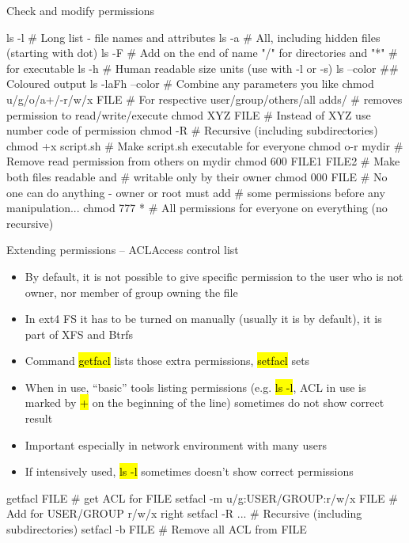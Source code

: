 \documentclass[compress, ucs, xelatex, 11pt, xcolor=svgnames,
  hyperref={
    bookmarks=true,
    unicode=true,
    colorlinks=true,
    pdftitle={Linux, command line and MetaCentrum},
    plainpages=false,
    pdfauthor={Vojtech Zeisek},
    pdfsubject={Course about use of Linux command line, writing shell scripts and using MetaCentrum of CESNET},
    pdfcreator={XeLaTeX},
    pdfkeywords={Linux, GNU, BASH, shell, command line, MetaCentrum},
    linkcolor=DarkRed,
    anchorcolor=DarkBlue,
    citecolor=Indigo,
    filecolor=NavyBlue,
    menucolor=DarkMagenta,
    urlcolor=DarkBlue,
    pdftex},
  url={hyphens, lowtilde} %
  ]{beamer}
\renewcommand{\texttt}[1]{\hl{\ttfamily #1}}
\begin{document}
\begin{frame}[fragile]{Check and modify permissions}
  \begin{bashcode}
    ls -l # Long list - file names and attributes
    ls -a # All, including hidden files (starting with dot)
    ls -F # Add on the end of name "/" for directories and "*"
          # for executable
    ls -h # Human readable size units (use with -l or -s)
    ls --color ## Coloured output
    ls -laFh --color # Combine any parameters you like
    chmod u/g/o/a+/-r/w/x FILE # For respective user/group/others/all adds/
                               # removes permission to read/write/execute
    chmod XYZ FILE # Instead of XYZ use number code of permission
    chmod -R # Recursive (including subdirectories)
    chmod +x script.sh # Make script.sh executable for everyone
    chmod o-r mydir # Remove read permission from others on mydir
    chmod 600 FILE1 FILE2 # Make both files readable and
                          # writable only by their owner
    chmod 000 FILE # No one can do anything - owner or root must add
                   # some permissions before any manipulation...
    chmod 777 * # All permissions for everyone on everything (no recursive)
  \end{bashcode}
\end{frame}

\begin{frame}[fragile]{Extending permissions -- ACL}{Access control list}
  \label{acl}
  \begin{itemize}
    \item By default, it is not possible to give specific permission to the user who is not owner, nor member of group owning the file
    \item In ext4 FS it has to be turned on manually (usually it is by default), it is part of XFS and Btrfs
    \item Command \texttt{getfacl} lists those extra permissions, \texttt{setfacl} sets
    \item When in use, ``basic'' tools listing permissions (e.g. \texttt{ls -l}, ACL in use is marked by \texttt{+} on the beginning of the line) sometimes do not show correct result
    \item Important especially in network environment with many users
    \item If intensively used, \texttt{ls -l} sometimes doesn't show correct permissions
  \end{itemize}
  \begin{bashcode}
    getfacl FILE # get ACL for FILE
    setfacl -m u/g:USER/GROUP:r/w/x FILE # Add for USER/GROUP r/w/x right
    setfacl -R ... # Recursive (including subdirectories)
    setfacl -b FILE # Remove all ACL from FILE
  \end{bashcode}
\end{frame}
\end{document}
